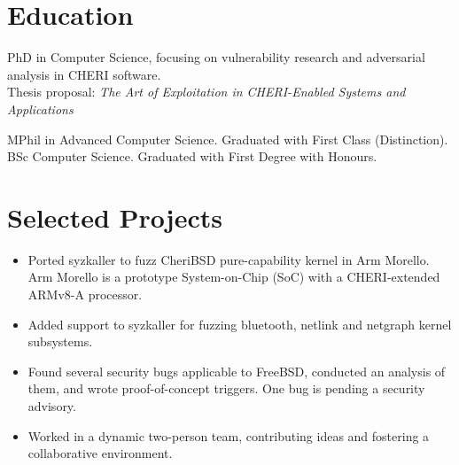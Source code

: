 \documentclass{resume}
\begin{document}



\section{Education}
PhD in Computer Science, focusing on vulnerability research and adversarial analysis in CHERI software. \\
Thesis proposal: \textit{The Art of Exploitation in CHERI-Enabled Systems and Applications}

MPhil in Advanced Computer Science. %
Graduated with First Class (Distinction).
BSc Computer Science. %
Graduated with First Degree with Honours.


\section{Selected Projects}

\begin{itemize}
  \item Ported syzkaller to fuzz CheriBSD pure-capability kernel in Arm Morello. Arm Morello is a prototype System-on-Chip (SoC) with a CHERI-extended ARMv8-A processor.
  \item Added support to syzkaller for fuzzing bluetooth, netlink and netgraph kernel subsystems.
  \item Found several security bugs applicable to FreeBSD, conducted an analysis of them, and wrote proof-of-concept triggers. One bug is pending a security advisory.
  \item Worked in a dynamic two-person team, contributing ideas and fostering a collaborative environment.
\end{itemize}
\end{document}
